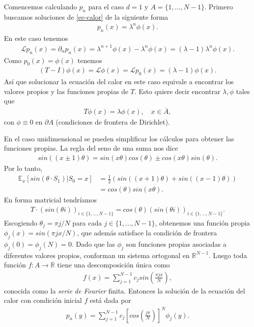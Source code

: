 \documentclass{article}
\numberwithin{equation}{section}
\begin{document}
Comencemos calculando $p_n$ para el caso $d=1$ y $A=\{1,...,N-1\}$. Primero buscamos soluciones de \eqref{ec-calor} de la siguiente forma
\begin{align*}
    p_n(x) = \lambda^n\phi(x).
\end{align*}
En este caso tenemos
\begin{align*}
    \mathcal{L}p_n(x) = \partial_np_n(x) = \lambda^{n+1}\phi(x) - \lambda^n\phi(x) = (\lambda-1)\lambda^n\phi(x).
\end{align*}
Como $p_0(x) = \phi(x)$ tenemos
\begin{align*}
   (T-I)\phi(x) = \mathcal{L}\phi(x) = \mathcal{L}p_0(x) = (\lambda - 1)\phi(x).
\end{align*}
Así que solucionar la ecuación del calor en este caso equivale a encontrar los valores propios y las funciones propias de $T$. Esto quiere decir encontrar $\lambda, \phi$ tales que
\begin{align*}
    T\phi(x) = \lambda\phi(x), \quad x \in \overline{A},
\end{align*}
con $\phi \equiv 0$ en $\partial A$ (condiciones de frontera de Dirichlet).

En el caso unidimensional se pueden simplificar los cálculos para obtener las funciones propias. La regla del seno de una suma nos dice
\begin{align*}
    sin((x\pm 1)\theta) = sin(x\theta)cos(\theta) \pm cos(x\theta)sin(\theta).
\end{align*}
Por lo tanto, 
\begin{align*}
    \mathbb{E}_x\left[sin(\theta \cdot S_1) | S_0 = x\right] &= \frac{1}{2}(sin((x+1)\theta) + sin((x-1)\theta))\\
    &= cos(\theta)sin(x\theta).
\end{align*}
En forma matricial tendríamos
\begin{align*}
    T\cdot(sin(\theta i))_{i\in\{1,...,N-1\}} = cos(\theta)(sin(\theta i))_{i\in\{1,...,N-1\}}.
\end{align*}
Escogiendo $\theta_j = \pi j/N$ para cada $j\in \{1,...,N-1\}$, obtenemos una función propia $\phi_j(x) = sin(\pi jx/N)$, que además satisface la condición de frontera $\phi_j(0) = \phi_j(N) = 0$. Dado que las $\phi_j$ son funciones propias asociadas a diferentes valores propios, conforman un sistema ortogonal en $\mathbb{R}^{N-1}$. Luego toda función $f : A \to \mathbb{R}$ tiene una descomposición única como
\begin{align}
    f(x) = \sum_{j=1}^{N-1}c_jsin\left(\frac{\pi jx}{N}\right),
\end{align}
conocida como la \emph{serie de Fourier} finita. Entonces la solución de la ecuación del calor con condición inicial $f$ está dada por 
\begin{align*}
    p_n(y) = \sum_{j=1}^{N-1}c_j\left[cos\left(\frac{j\pi}{N}\right)\right]^N\phi_j(y).
\end{align*}
\end{document}
